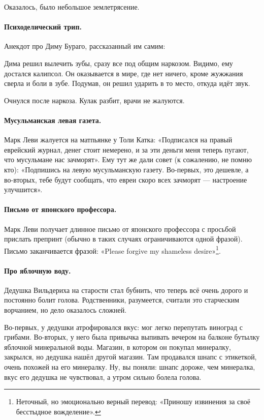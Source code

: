 \documentclass{book}
\begin{document}
Оказалось, было небольшое землетрясение.

\paragraph{Психоделический трип.}
Анекдот про Диму Бураго, рассказанный им самим:

Дима решил вылечить зубы, сразу все под общим наркозом.
Видимо, ему достался калипсол.
Он оказывается в мире, где нет ничего, кроме жужжания сверла и боли в зубе.
Подумав, он решил ударить в то место, откуда идёт звук.

Очнулся после наркоза.
Кулак разбит, врачи не жалуются.

\paragraph{Мусульманская левая газета.}
Марк Леви жалуется на матпьянке у Толи Катка: «Подписался на правый еврейский журнал, денег стоит немерено, и за эти деньги меня теперь пугают, что мусульмане нас зачморят».
Ему тут же дали совет (к сожалению, не помню кто):
«Подпишись на левую мусульманскую газету. 
Во-первых, это дешевле, а во-вторых, тебе будут сообщать, что евреи скоро всех зачморят --- настроение улучшится».

\paragraph{Письмо от японского профессора.}
Марк Леви получает длинное письмо от японского профессора с просьбой прислать препринт (обычно в таких случаях ограничиваются одной фразой).
Письмо заканчивается фразой: «Please forgive my shameless desire»\footnote{Неточный, но эмоционально верный перевод: «Приношу извинения за своё бесстыдное вожделение».}.

\paragraph{Про яблочную воду.}
Дедушка Вильдериха на старости стал бубнить, что теперь всё очень дорого и постоянно болит голова.
Родственники, разумеется, считали это старческим ворчанием, но дело оказалось сложней.

Во-первых, у дедушки атрофировался вкус: мог легко перепутать виноград с грибами.
Во-вторых, у него была привычка выпивать вечером на балконе бутылку яблочной минеральной воды.
Магазин, в котором он покупал минералку, закрылся, но дедушка нашёл другой магазин.
Там продавался шнапс с этикеткой, очень похожей на его минералку.
Ну, вы поняли: шнапс дороже, чем минералка, вкус его дедушка не чувствовал, а утром сильно болела голова.
\end{document}
